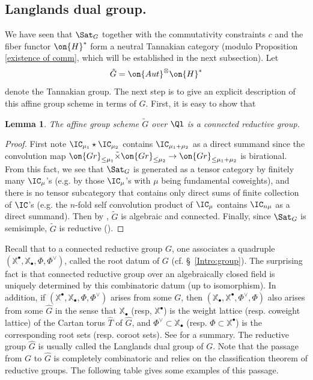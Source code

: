 \documentclass[]{pcmi}
\theoremstyle{plain}
\newtheorem{lem}[equation]{Lemma}
\theoremstyle{remark}
\theoremstyle{definition}
\newcommand{\Aut}{{\on{Aut}}}
\newcommand{\Gr}{{\on{Gr}}}
\def\xcoch{\mathbb{X}_\bullet}
\def\xch{\mathbb{X}^\bullet}
\begin{document}
\subsection{Langlands dual group.}\label{MV semiinfinite}
We have seen that $\Sat_G$ together with the commutativity constraints $c$ and the fiber functor $\on{H}^*$ form a neutral Tannakian category (modulo Proposition \ref{existence of comm}, which will be established in the next subsection).
Let 
$$\tilde G=\Aut^\otimes \on{H}^*$$ denote the Tannakian group. The next step is to give an explicit description of this affine group scheme in terms of $G$. First, it is easy to show that
\begin{lem}The affine group scheme $\tilde G$ over $\Ql$ is a connected reductive group.
\end{lem}
\begin{proof}First note $\IC_{\mu_1}\star\IC_{\mu_2}$ contains $\IC_{\mu_1+\mu_2}$ as a direct summand since the convolution map $\Gr_{\leq\mu_1}\tilde\times\Gr_{\leq \mu_2}\to \Gr_{\leq \mu_1+\mu_2}$ is birational. From this fact, we see that $\Sat_G$ is generated as a tensor category by finitely many $\IC_\mu$'s (e.g. by those $\IC_\mu$'s with $\mu$ being fundamental coweights), and there is no tensor subcategory that contains only direct sums of finite collection of $\IC$'s (e.g. the $n$-fold self convolution product of $\IC_\mu$ contains $\IC_{n\mu}$ as a direct summand). Then by \cite[Proposition 2.20, Corollary 2.22]{DM}, $\tilde G$ is algebraic and connected. Finally, since $\Sat_G$ is semisimple, $\tilde G$ is reductive (\cite[Proposition 2.23]{DM}).
\end{proof}



Recall that to a connected reductive group $G$, one associates a quadruple $(\xch,\xcoch,\Phi,\Phi^\vee)$, called the root datum of $G$ (cf. \S~\ref{Intro:group}). 
The surprising fact is that connected reductive group over an algebraically closed field is uniquely determined by this combinatoric datum  (up to isomorphism). In addition, if $(\xch,\xcoch,\Phi,\Phi^\vee)$ arises from some $G$, then $(\xcoch,\xch,\Phi^\vee,\Phi)$ also arises from some $\hat G$ in the sense that $\xcoch$ (resp, $\xch$) is the weight lattice (resp. coweight lattice) of the Cartan torus $\hat T$ of $\hat G$, and $\Phi^\vee\subset \xcoch$ (resp. $\Phi\subset\xch$) is the corresponding root sets (resp. coroot sets). See \cite[\S~1,2]{Sp} for a summary. The reductive group $\hat G$ is usually called the Langlands dual group of $G$.
Note that the passage from $G$ to $\hat G$ is completely combinatoric and relies on the classification theorem of reductive groups. The following table gives some examples of this passage.
\end{document}
